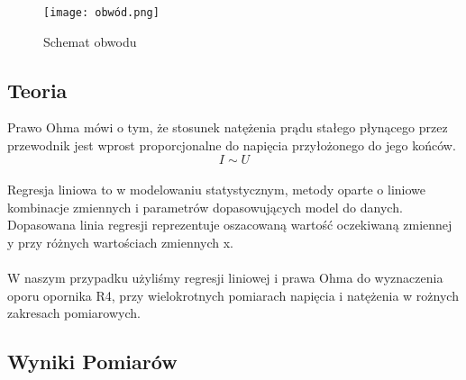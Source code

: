 \documentclass{article}
\begin{document}
\begin{figure}[h!]
\centering
\texttt{[image: obwód.png]}
\caption{Schemat obwodu}
\end{figure}

\subsection{Teoria}
Prawo Ohma mówi o tym, że stosunek natężenia prądu stałego płynącego przez przewodnik jest wprost proporcjonalne do napięcia przyłożonego do jego końców. 
$$ I \sim U $$
\\
Regresja liniowa to w modelowaniu statystycznym, metody oparte o liniowe kombinacje zmiennych i parametrów dopasowujących model do danych. Dopasowana linia regresji reprezentuje oszacowaną wartość oczekiwaną zmiennej y przy różnych wartościach zmiennych x.
\\\\
W naszym przypadku użyliśmy regresji liniowej i prawa Ohma do wyznaczenia oporu opornika R4, przy wielokrotnych pomiarach napięcia i natężenia w rożnych zakresach pomiarowych.


\clearpage


\subsection{Wyniki Pomiarów}
\end{document}
